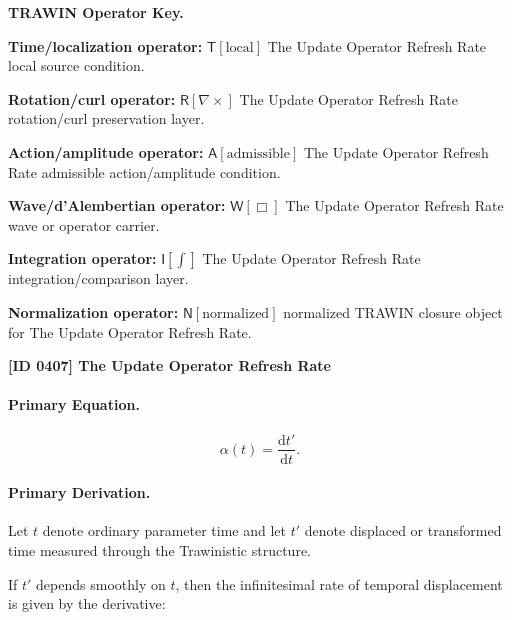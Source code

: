 \par\vspace{0.45\baselineskip}
\noindent\begin{minipage}[t]{\linewidth}
\begingroup
\small
\raggedright
\textbf{TRAWIN Operator Key.}\par
\noindent\textbf{Time/localization operator:} $\mathsf{T}\!\left[\mathrm{local}\right]$ The Update Operator Refresh Rate local source condition.\par
\noindent\textbf{Rotation/curl operator:} $\mathsf{R}\!\left[\nabla\times\right]$ The Update Operator Refresh Rate rotation/curl preservation layer.\par
\noindent\textbf{Action/amplitude operator:} $\mathsf{A}\!\left[\mathrm{admissible}\right]$ The Update Operator Refresh Rate admissible action/amplitude condition.\par
\noindent\textbf{Wave/d'Alembertian operator:} $\mathsf{W}\!\left[\Box\right]$ The Update Operator Refresh Rate wave or operator carrier.\par
\noindent\textbf{Integration operator:} $\mathsf{I}\!\left[\int\right]$ The Update Operator Refresh Rate integration/comparison layer.\par
\noindent\textbf{Normalization operator:} $\mathsf{N}\!\left[\mathrm{normalized}\right]$ normalized TRAWIN closure object for The Update Operator Refresh Rate.\par
\endgroup
\end{minipage}

\clearpage
\noindent\textbf{[ID 0407] The Update Operator Refresh Rate}\par
\vspace{0.35em}
\paragraph{Primary Equation.}
\begin{equation}
\alpha(t)=\frac{\mathrm{d}t'}{\mathrm{d}t}.
\end{equation}

\paragraph{Primary Derivation.}
Let $t$ denote ordinary parameter time and let $t'$ denote displaced or transformed time measured through the Trawinistic structure.

If $t'$ depends smoothly on $t$, then the infinitesimal rate of temporal displacement is given by the derivative:

